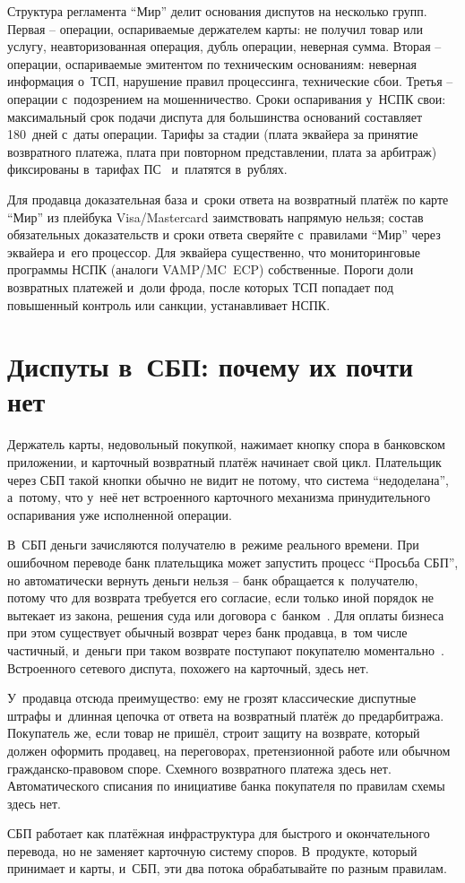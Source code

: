 Структура регламента \enquote{Мир} делит основания диспутов
на несколько групп. Первая -- операции, оспариваемые держателем карты:
не получил товар или услугу, неавторизованная операция, дубль
операции, неверная сумма. Вторая -- операции, оспариваемые эмитентом
по техническим основаниям: неверная информация о~ТСП, нарушение
правил процессинга, технические сбои. Третья -- операции с~подозрением на мошенничество. Сроки
оспаривания у~НСПК свои: максимальный срок подачи диспута
для большинства оснований составляет 180~дней с~даты операции. Тарифы за стадии
(плата эквайера за принятие возвратного платежа, плата при повторном представлении,
плата за арбитраж) фиксированы в~тарифах ПС~\cite{nspk-mir-tariffs} и~платятся в~рублях.

Для продавца доказательная база и~сроки
ответа на возвратный платёж по карте \enquote{Мир} из плейбука Visa/Mastercard
заимствовать напрямую нельзя; состав обязательных доказательств и
сроки ответа сверяйте с~правилами \enquote{Мир} через эквайера и~его
процессор. Для эквайера существенно, что мониторинговые программы НСПК
(аналоги VAMP/MC~ECP) собственные. Пороги доли возвратных платежей и~доли фрода,
после которых ТСП попадает под повышенный контроль или
санкции, устанавливает НСПК.

\section{Диспуты в~СБП: почему их почти нет}\label{sec:disputes-sbp}

Держатель карты, недовольный покупкой, нажимает кнопку спора в
банковском приложении, и карточный возвратный платёж начинает свой цикл.
Плательщик через СБП такой кнопки обычно не видит не потому,
что система \enquote{недоделана}, а~потому, что у~неё нет встроенного
карточного механизма принудительного оспаривания уже исполненной
операции.

В~СБП деньги зачисляются получателю в~режиме реального времени. При
ошибочном переводе банк плательщика может запустить процесс
\enquote{Просьба СБП}, но автоматически вернуть деньги нельзя --
банк обращается к~получателю, потому что для возврата требуется его
согласие, если только иной порядок не вытекает из закона, решения суда
или договора с~банком~\cite{cbr-sbp-faq-mistaken-transfer}.
Для оплаты бизнеса при этом существует обычный возврат через банк
продавца, в~том числе частичный, и~деньги при таком возврате
поступают покупателю моментально~\cite{sbp-faq-business}.
Встроенного сетевого диспута, похожего на карточный, здесь нет.

У~продавца отсюда преимущество: ему не грозят классические диспутные
штрафы и~длинная цепочка от ответа на возвратный платёж до предарбитража.
Покупатель же, если товар не пришёл, строит защиту на возврате,
который должен оформить продавец, на переговорах, претензионной
работе или обычном гражданско-правовом споре. Схемного возвратного платежа здесь нет. Автоматического списания по инициативе банка
покупателя по правилам схемы здесь нет.

СБП работает как платёжная инфраструктура для быстрого и окончательного перевода,
но не заменяет карточную систему споров. В~продукте, который принимает
и карты, и~СБП, эти два потока обрабатывайте по разным правилам.
